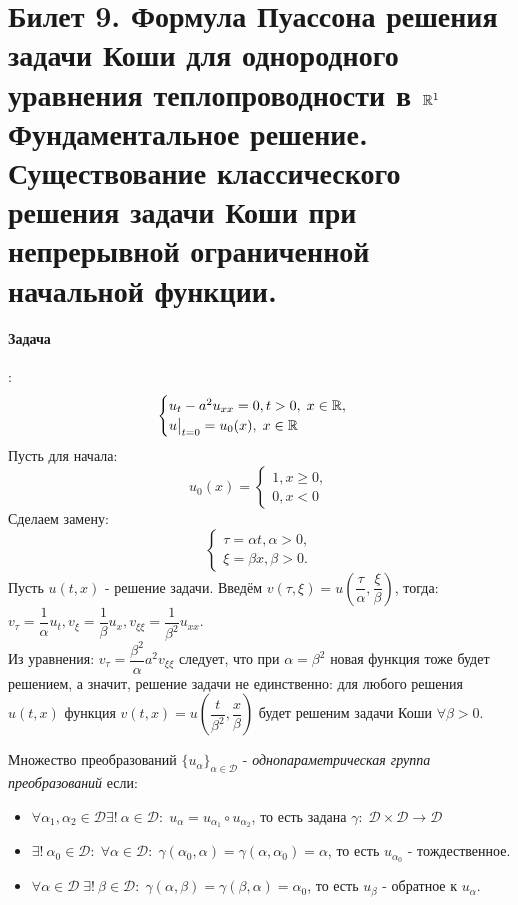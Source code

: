\section{Билет 9. Формула Пуассона решения задачи Коши для однородного уравнения теплопроводности в $\mathbb{R}^1$ Фундаментальное решение. Существование классического решения задачи Коши при непрерывной ограниченной начальной функции.}

\paragraph{Задача}:
\begin{equation*}
\begin{cases}
	u_t - a^2u_{xx} = 0, t > 0, \; x \in \mathbb{R}, \\
	u\bigr|_{t = 0} = u_0(x), \; x \in \mathbb{R}
\end{cases}
\end{equation*}
Пусть для начала:
\begin{equation*}
	u_0(x) = \begin{cases} 
1, x \geq 0, \\
0, x < 0 
\end{cases} 
\end{equation*}
Сделаем замену: 
\begin{equation*}
\begin{cases}
	\tau = \alpha t, \alpha > 0, \\
	\xi = \beta x, \beta > 0.
\end{cases}
\end{equation*}
Пусть $u(t, x)$ - решение задачи. Введём $v(\tau, \xi) = u\left(\dfrac{\tau}{\alpha}, \dfrac{\xi}{\beta}\right)$, тогда: $v_\tau = \dfrac{1}{\alpha}u_t, v_{\xi} = \dfrac{1}{\beta}u_x, v_{\xi \xi} = \dfrac{1}{\beta^2}u_{xx}$. \\
Из уравнения: $v_{\tau} = \dfrac{\beta^2}{\alpha}a^2v_{\xi \xi}$ следует, что при $\alpha = \beta^2$ новая функция тоже будет решением, а значит, решение задачи не единственно: для любого решения $u(t, x)$ функция $v(t, x) = u\left(\dfrac{t}{\beta^2}, \dfrac{x}{\beta}\right)$ будет решеним задачи Коши $\forall \beta > 0$.
\begin{definition} 
Множество преобразований $\{u_{\alpha}\}_{\alpha \in \mathcal{D}}$ - \textit{однопараметрическая группа преобразований} если:
\begin{itemize}
\item $\forall \alpha_1, \alpha_2 \in \mathcal{D} \exists !~ \alpha \in \mathcal{D}\colon\; u_{\alpha} = u_{\alpha_1} \circ u_{\alpha_2}$, то есть задана $\gamma\colon\; \mathcal{D} \times \mathcal{D} \to \mathcal{D}$
\item $\exists ! ~\alpha_{0} \in \mathcal{D}\colon\; \forall \alpha \in \mathcal{D}\colon\; \gamma(\alpha_0, \alpha) = \gamma(\alpha, \alpha_0) = \alpha$, то есть $u_{\alpha_0}$ - тождественное.
\item $\forall \alpha \in \mathcal{D}\; \exists !~ \beta \in \mathcal{D}\colon\; \gamma(\alpha, \beta) = \gamma(\beta, \alpha) = \alpha_0$, то есть $u_{\beta}$ - обратное к $u_{\alpha}$.
\end{itemize}
\end{definition}
